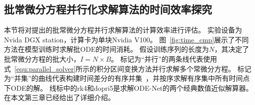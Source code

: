 \subsection{批常微分方程并行化求解算法的时间效率探究}
\label{sec:5_parallel_experiment}
本节将对提出的批常微分方程并行求解算法的计算效率进行评估。
实验设备为Nvida DGX station，计算卡为单块Nvidia V100。
图~\ref{fig:time_cmp}展示了不同方法在模型训练时求解批ODE的时间消耗。
假设训练序列的长度为$N$，其决定了批常微分方程的批大小，$I=N\times B$。
标记为“并行”的两条线代表使用式~\eqref{equ:parallel_solver}所示的积分区间变换方法并行求解多个常微分方程。
标记为“并集”的曲线代表构建时间差分的有序并集~\cite{yildiz2021continuous,Rubanova2019}，并按序求解有序集中所有时间点下ODE的解。
线标中的rk4和dopri5是求解ODE-Net的两个经典数值近似解算器\cite{chen2018neuralode,Yuan2022}。在本文第三章已经给出了详细介绍。


